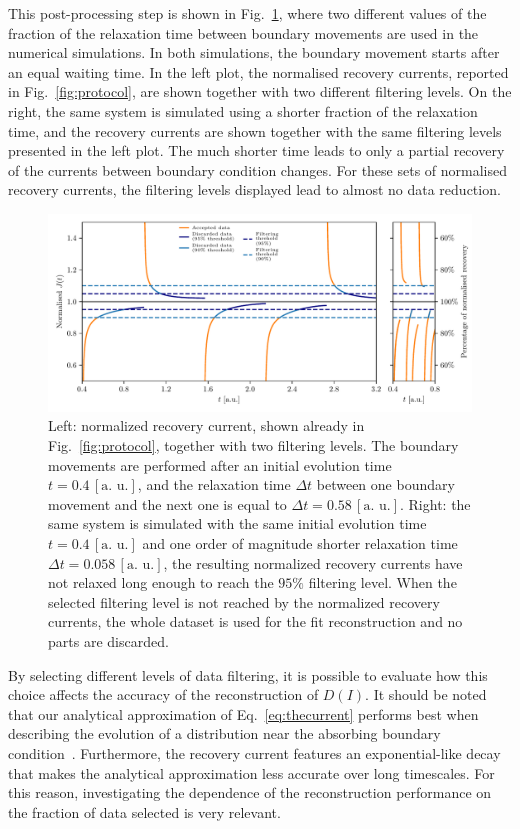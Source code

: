 This post-processing step is shown in Fig.~\ref{fig:postprocessing}, where two different values of the fraction of the relaxation time between boundary movements are used in the numerical simulations. In both simulations, the boundary movement starts after an equal waiting time. In the left plot, the normalised recovery currents, reported in Fig.~\ref{fig:protocol}, are shown together with two different filtering levels. On the right, the same system is simulated using a shorter fraction of the relaxation time, and the recovery currents are shown together with the same filtering levels presented in the left plot. The much shorter time leads to only a partial recovery of the currents between boundary condition changes. For these sets of normalised recovery currents, the filtering levels displayed lead to almost no data reduction.
%
\begin{figure}[htp]
    \centering 
    \includegraphics[width=\textwidth]{4_probing_the_diffusive_behavior/figs/final/the_discarded_data.pdf}
    \caption{Left: normalized recovery current, shown already in Fig.~\ref{fig:protocol}, together with two filtering levels. The boundary movements are performed after an initial evolution time $t=0.4 \, [\text{a. u.}]$, and the relaxation time $\Delta t$ between one boundary movement and the next one is equal to $\Delta t=0.58 \, [\text{a. u.}]$. Right: the same system is simulated with the same initial evolution time $t=0.4 \, [\text{a. u.}]$ and one order of magnitude shorter relaxation time $\Delta t=0.058 \, [\text{a. u.}]$, the resulting normalized recovery currents have not relaxed long enough to reach the $95\%$ filtering level. When the selected filtering level is not reached by the normalized recovery currents, the whole dataset is used for the fit reconstruction and no parts are discarded.}
    \label{fig:postprocessing}
\end{figure}
%

By selecting different levels of data filtering, it is possible to evaluate how this choice affects the accuracy of the reconstruction of $D(I)$. It should be noted that our analytical approximation of Eq.~\eqref{eq:thecurrent} performs best when describing the evolution of a distribution near the absorbing boundary condition~\cite{montanari:ipac2021:tupab233}. Furthermore, the recovery current features an exponential-like decay that makes the analytical approximation less accurate over long timescales. For this reason, investigating the dependence of the reconstruction performance on the fraction of data selected is very relevant.

